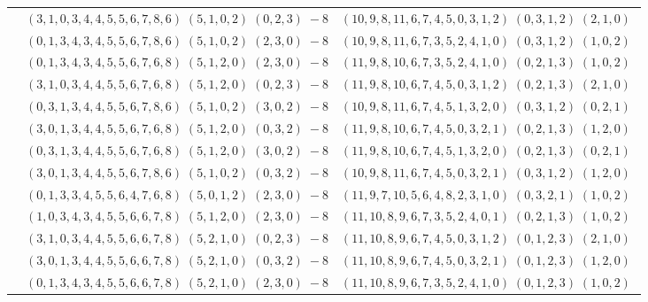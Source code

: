 \documentclass[11pt]{article}
\begin{document}
\begin{longtable}[l]{|c|c|c|}
 \cline{2-3} 
 & $(3 ,1 ,0 ,3 ,4 ,4 ,5 ,5 ,6 ,7 ,8 ,6) \;(5 ,1 ,0 ,2) \;(0 ,2 ,3) \;-8$ & $(10 ,9 ,8 ,11 ,6 ,7 ,4 ,5 ,0 ,3 ,1 ,2) \;(0 ,3 ,1 ,2) \;(2 ,1 ,0) \;$\\ 
 \cline{2-3} 
 & $(0 ,1 ,3 ,4 ,3 ,4 ,5 ,5 ,6 ,7 ,8 ,6) \;(5 ,1 ,0 ,2) \;(2 ,3 ,0) \;-8$ & $(10 ,9 ,8 ,11 ,6 ,7 ,3 ,5 ,2 ,4 ,1 ,0) \;(0 ,3 ,1 ,2) \;(1 ,0 ,2) \;$\\ 
 \cline{2-3} 
 & $(0 ,1 ,3 ,4 ,3 ,4 ,5 ,5 ,6 ,7 ,6 ,8) \;(5 ,1 ,2 ,0) \;(2 ,3 ,0) \;-8$ & $(11 ,9 ,8 ,10 ,6 ,7 ,3 ,5 ,2 ,4 ,1 ,0) \;(0 ,2 ,1 ,3) \;(1 ,0 ,2) \;$\\ 
 \cline{2-3} 
 & $(3 ,1 ,0 ,3 ,4 ,4 ,5 ,5 ,6 ,7 ,6 ,8) \;(5 ,1 ,2 ,0) \;(0 ,2 ,3) \;-8$ & $(11 ,9 ,8 ,10 ,6 ,7 ,4 ,5 ,0 ,3 ,1 ,2) \;(0 ,2 ,1 ,3) \;(2 ,1 ,0) \;$\\ 
 \cline{2-3} 
 & $(0 ,3 ,1 ,3 ,4 ,4 ,5 ,5 ,6 ,7 ,8 ,6) \;(5 ,1 ,0 ,2) \;(3 ,0 ,2) \;-8$ & $(10 ,9 ,8 ,11 ,6 ,7 ,4 ,5 ,1 ,3 ,2 ,0) \;(0 ,3 ,1 ,2) \;(0 ,2 ,1) \;$\\ 
 \cline{2-3} 
 & $(3 ,0 ,1 ,3 ,4 ,4 ,5 ,5 ,6 ,7 ,6 ,8) \;(5 ,1 ,2 ,0) \;(0 ,3 ,2) \;-8$ & $(11 ,9 ,8 ,10 ,6 ,7 ,4 ,5 ,0 ,3 ,2 ,1) \;(0 ,2 ,1 ,3) \;(1 ,2 ,0) \;$\\ 
 \cline{2-3} 
 & $(0 ,3 ,1 ,3 ,4 ,4 ,5 ,5 ,6 ,7 ,6 ,8) \;(5 ,1 ,2 ,0) \;(3 ,0 ,2) \;-8$ & $(11 ,9 ,8 ,10 ,6 ,7 ,4 ,5 ,1 ,3 ,2 ,0) \;(0 ,2 ,1 ,3) \;(0 ,2 ,1) \;$\\ 
 \cline{2-3} 
 & $(3 ,0 ,1 ,3 ,4 ,4 ,5 ,5 ,6 ,7 ,8 ,6) \;(5 ,1 ,0 ,2) \;(0 ,3 ,2) \;-8$ & $(10 ,9 ,8 ,11 ,6 ,7 ,4 ,5 ,0 ,3 ,2 ,1) \;(0 ,3 ,1 ,2) \;(1 ,2 ,0) \;$\\ 
 \cline{2-3} 
 & $(0 ,1 ,3 ,3 ,4 ,5 ,5 ,6 ,4 ,7 ,6 ,8) \;(5 ,0 ,1 ,2) \;(2 ,3 ,0) \;-8$ & $(11 ,9 ,7 ,10 ,5 ,6 ,4 ,8 ,2 ,3 ,1 ,0) \;(0 ,3 ,2 ,1) \;(1 ,0 ,2) \;$\\ 
 \cline{2-3} 
 & $(1 ,0 ,3 ,4 ,3 ,4 ,5 ,5 ,6 ,6 ,7 ,8) \;(5 ,1 ,2 ,0) \;(2 ,3 ,0) \;-8$ & $(11 ,10 ,8 ,9 ,6 ,7 ,3 ,5 ,2 ,4 ,0 ,1) \;(0 ,2 ,1 ,3) \;(1 ,0 ,2) \;$\\ 
 \cline{2-3} 
 & $(3 ,1 ,0 ,3 ,4 ,4 ,5 ,5 ,6 ,6 ,7 ,8) \;(5 ,2 ,1 ,0) \;(0 ,2 ,3) \;-8$ & $(11 ,10 ,8 ,9 ,6 ,7 ,4 ,5 ,0 ,3 ,1 ,2) \;(0 ,1 ,2 ,3) \;(2 ,1 ,0) \;$\\ 
 \cline{2-3} 
 & $(3 ,0 ,1 ,3 ,4 ,4 ,5 ,5 ,6 ,6 ,7 ,8) \;(5 ,2 ,1 ,0) \;(0 ,3 ,2) \;-8$ & $(11 ,10 ,8 ,9 ,6 ,7 ,4 ,5 ,0 ,3 ,2 ,1) \;(0 ,1 ,2 ,3) \;(1 ,2 ,0) \;$\\ 
 \cline{2-3} 
 & $(0 ,1 ,3 ,4 ,3 ,4 ,5 ,5 ,6 ,6 ,7 ,8) \;(5 ,2 ,1 ,0) \;(2 ,3 ,0) \;-8$ & $(11 ,10 ,8 ,9 ,6 ,7 ,3 ,5 ,2 ,4 ,1 ,0) \;(0 ,1 ,2 ,3) \;(1 ,0 ,2) \;$\\ 

\end{longtable}
\end{document}
